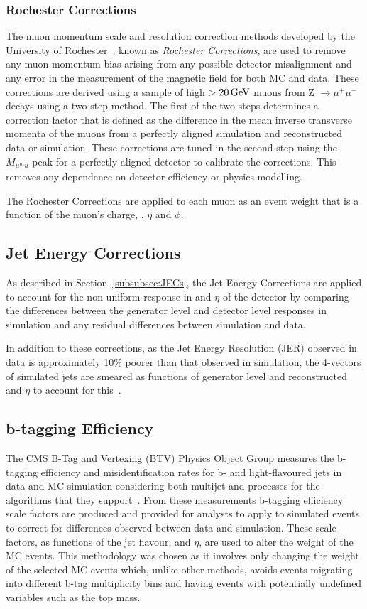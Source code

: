 \subsubsection{Rochester Corrections}
The muon momentum scale and resolution correction methods developed by the University of Rochester~\cite{rochester}, known as \emph{Rochester Corrections}, are used to remove any muon momentum bias arising from any possible detector misalignment and any error in the measurement of the magnetic field for both MC and data.
These corrections are derived using a sample of high \pt $> 20\,\text{Ge\hspace{-.08em}V}$ muons from Z $ \rightarrow \mu^{+}\mu^{-}$ decays using a two-step method.
The first of the two steps determines a correction factor that is defined as the difference in the mean inverse transverse momenta of the muons from a perfectly aligned simulation and reconstructed data or simulation.
These corrections are tuned in the second step using the $M_{\mu^mu}$ peak for a perfectly aligned detector to calibrate the corrections.
This removes any dependence on detector efficiency or physics modelling.

The Rochester Corrections are applied to each muon as an event weight that is a function of the muon's charge, \pt, $\eta$ and $\phi$.

\subsection{Jet Energy Corrections}\label{subsec:jesjer}
As described in Section~\ref{subsubsec:JECs}, the Jet Energy Corrections are applied to account for the non-uniform response in \pT and $\eta$ of the detector by comparing the differences between the generator level and detector level responses in simulation and any residual differences between simulation and data.

In addition to these corrections, as the Jet Energy Resolution (JER) observed in data is approximately 10\% poorer than that observed in simulation, the 4-vectors of simulated jets are smeared as functions of generator level and reconstructed \pt and $\eta$ to account for this~\cite{Khachatryan:2016kdb}.

\subsection{b-tagging Efficiency}\label{subsec:btagEff}
The CMS B-Tag and Vertexing (BTV) Physics Object Group measures the b-tagging efficiency and misidentification rates for b- and light-flavoured jets in data and MC simulation considering both multijet and \ttbar processes for the algorithms that they support~\cite{Sirunyan:2017ezt}.
From these measurements b-tagging efficiency scale factors are produced and provided for analysts to apply to simulated events to correct for differences observed between data and simulation.
These scale factors, as functions of the jet flavour, \pT and $\eta$, are used to alter the weight of the MC events.
This methodology was chosen as it involves only changing the weight of the selected MC events which, unlike other methods, avoids events migrating into different b-tag multiplicity bins and having events with potentially undefined variables such as the top mass.

